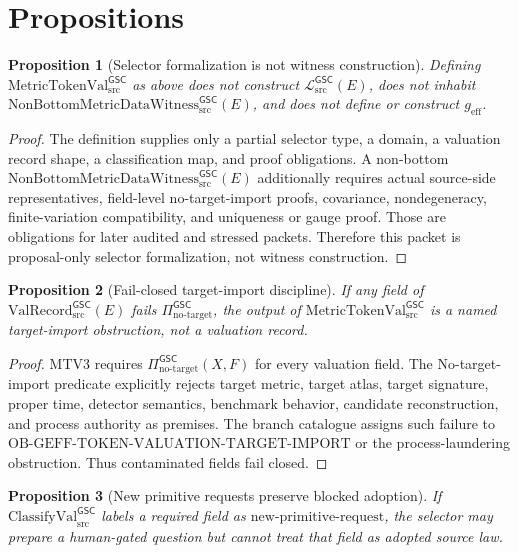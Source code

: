 \documentclass[11pt]{article}
\newcommand{\MetricTokenVal}{\mathrm{MetricTokenVal}_{\mathrm{src}}^{\mathsf{GSC}}}
\newcommand{\ValRecord}{\mathrm{ValRecord}_{\mathrm{src}}^{\mathsf{GSC}}}
\newcommand{\Witness}{\mathrm{NonBottomMetricDataWitness}_{\mathrm{src}}^{\mathsf{GSC}}}
\newcommand{\MetricData}{\mathcal{L}_{\mathrm{src}}^{\mathsf{GSC}}}
\newcommand{\geff}{g_{\mathrm{eff}}}
\newcommand{\ClassVal}{\mathrm{ClassifyVal}_{\mathrm{src}}^{\mathsf{GSC}}}
\newcommand{\NoTarget}{\Pi_{\mathrm{no\mbox{-}target}}^{\mathsf{GSC}}}
\newtheorem{proposition}{Proposition}
\begin{document}
\section{Propositions}

\begin{proposition}[Selector formalization is not witness construction]
Defining \(\MetricTokenVal\) as above does not construct \(\MetricData(E)\),
does not inhabit \(\Witness(E)\), and does not define or construct \(\geff\).
\end{proposition}

\begin{proof}
The definition supplies only a partial selector type, a domain, a valuation
record shape, a classification map, and proof obligations. A non-bottom
\(\Witness(E)\) additionally requires actual source-side representatives,
field-level no-target-import proofs, covariance, nondegeneracy,
finite-variation compatibility, and uniqueness or gauge proof. Those are
obligations for later audited and stressed packets. Therefore this packet is
proposal-only selector formalization, not witness construction.
\end{proof}

\begin{proposition}[Fail-closed target-import discipline]
If any field of \(\ValRecord(E)\) fails \(\NoTarget\), the output of
\(\MetricTokenVal\) is a named target-import obstruction, not a valuation
record.
\end{proposition}

\begin{proof}
MTV3 requires \(\NoTarget(X,F)\) for every valuation field. The
No-target-import predicate explicitly rejects target metric, target atlas,
target signature, proper time, detector semantics, benchmark behavior,
candidate reconstruction, and process authority as premises. The branch
catalogue assigns such failure to
\(\mathrm{OB\mbox{-}GEFF\mbox{-}TOKEN\mbox{-}VALUATION\mbox{-}TARGET\mbox{-}IMPORT}\)
or the process-laundering obstruction. Thus contaminated fields fail closed.
\end{proof}

\begin{proposition}[New primitive requests preserve blocked adoption]
If \(\ClassVal\) labels a required field as
\(\mathrm{new\mbox{-}primitive\mbox{-}request}\), the selector may prepare a
human-gated question but cannot treat that field as adopted source law.
\end{proposition}
\end{document}
